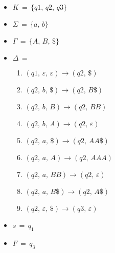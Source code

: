 \begin{tcolorbox}[colback=yellow!15!white, colframe=blue!50!white,
	fonttitle=\bfseries\Large, title = {PDA $M = (K,\, \Sigma,\, \Gamma,\, \Delta,\, s,\, F)$}]
\begin{itemize}
	\itemsep0em
	\item $K \,=\, \{q1,\, q2,\, q3\}$
	\reducevspace\reducevspace\reducevspace
	\item $\Sigma \,=\, \{a,\, b\}$
	\reducevspace\reducevspace\reducevspace
	\item $\Gamma \,=\, \{A,\, B,\, \$\}$
	\reducevspace\reducevspace\reducevspace
	\item $\Delta \,=\,$
	\reducevspace\reducevspace\reducevspace\reducevspace\reducevspace\reducevspace\reducevspace
	\reducevspace\reducevspace\reducevspace\reducevspace\reducevspace\reducevspace\reducevspace
		\begin{multicols}{2}
		\begin{enumerate}
			\item $(q1,\,ε,\,ε)\rightarrow(q2,\,\$)$



			\item $(q2,\,b,\,\$)\rightarrow(q2,\,B\$)$
			\item $(q2,\,b,\,B)\rightarrow(q2,\,BB)$
			\item $(q2,\,b,\,Α)\rightarrow(q2,\,ε)$

			\item $(q2,\,a,\,\$)\rightarrow(q2,\,AA\$)$
			\item $(q2,\,a,\,A)\rightarrow(q2,\,AAA)$
			\item $(q2,\,a,\,BB)\rightarrow(q2,\,ε)$
			\item $(q2,\,a,\,B\$)\rightarrow(q2,\,A\$)$

			\item $(q2,\,ε,\,\$)\rightarrow(q3,\,ε)$
		\end{enumerate}
		\end{multicols}
		\reducevspace\reducevspace\reducevspace\reducevspace\reducevspace
		\reducevspace\reducevspace\reducevspace\reducevspace\reducevspace
	\item $s \,=\, q_1$
	\reducevspace\reducevspace\reducevspace
	\item $F \,=\, q_3$
\end{itemize}
\end{tcolorbox}
\reducevspace\reducevspace\reducevspace\reducevspace

